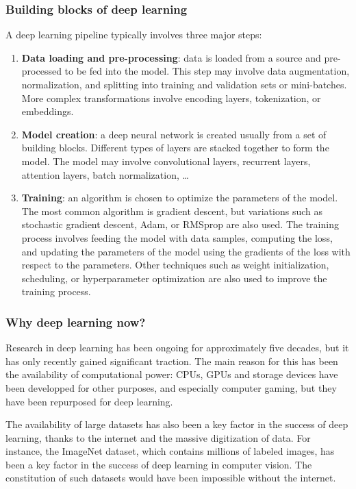 \subsubsection{Building blocks of deep learning}
A deep learning pipeline typically involves three major steps:
\begin{enumerate}
    \item \textbf{Data loading and pre-processing}: data is loaded from a source and pre-processed to be fed into the model. This step may involve data augmentation, normalization, and splitting into training and validation sets or mini-batches. More complex transformations involve encoding layers, tokenization, or embeddings.
    \item \textbf{Model creation}: a deep neural network is created usually from a set of building blocks. Different types of layers are stacked together to form the model. The model may involve convolutional layers, recurrent layers, attention layers, batch normalization, \dots
    \item \textbf{Training}: an algorithm is chosen to optimize the parameters of the model. The most common algorithm is gradient descent, but variations such as stochastic gradient descent, Adam, or RMSprop are also used. The training process involves feeding the model with data samples, computing the loss, and updating the parameters of the model using the gradients of the loss with respect to the parameters. Other techniques such as weight initialization, scheduling, or hyperparameter optimization are also used to improve the training process.
\end{enumerate}

\subsubsection{Why deep learning now?}
Research in deep learning has been ongoing for approximately five decades, but it has only recently gained significant traction. The main reason for this has been the availability of computational power: CPUs, GPUs and storage devices have been developped for other purposes, and especially computer gaming, but they have been repurposed for deep learning. 

The availability of large datasets has also been a key factor in the success of deep learning, thanks to the internet and the massive digitization of data. For instance, the ImageNet dataset, which contains millions of labeled images, has been a key factor in the success of deep learning in computer vision. The constitution of such datasets would have been impossible without the internet.

